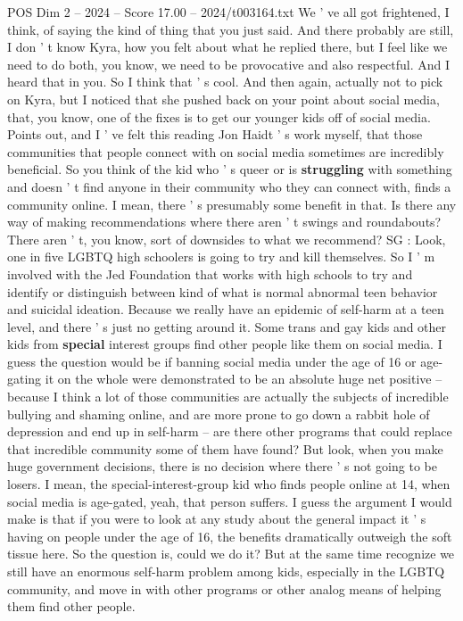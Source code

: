 \begin{textsample}{POS Dim 2 – 2024 – Score 17.00 – 2024/t003164.txt}
We ' ve all got frightened, I think, of saying the kind of thing that you just said.
And there probably are still, I don ' t know Kyra, how you felt about what he replied there, but I feel like we need to do both, you know, we need to be provocative and also respectful.
And I heard that in you.
So I think that ' s cool.
And then again, actually not to pick on Kyra, but I noticed that she pushed back on your point about social media, that, you know, one of the fixes is to get our younger kids off of social media.
Points out, and I ' ve felt this reading Jon Haidt ' s work myself, that those communities that people connect with on social media sometimes are incredibly beneficial.
So you think of the kid who ' s queer or is \textbf{struggling} with something and doesn ' t find anyone in their community who they can connect with, finds a community online.
I mean, there ' s presumably some benefit in that.
Is there any way of making recommendations where there aren ' t swings and roundabouts?
There aren ' t, you know, sort of downsides to what we recommend?
SG : Look, one in five LGBTQ high schoolers is going to try and kill themselves.
So I ' m involved with the Jed Foundation that works with high schools to try and identify or distinguish between kind of what is normal abnormal teen behavior and suicidal ideation.
Because we really have an epidemic of self-harm at a teen level, and there ' s just no getting around it.
Some trans and gay kids and other kids from \textbf{special} interest groups find other people like them on social media.
I guess the question would be if banning social media under the age of 16 or age-gating it on the whole were demonstrated to be an absolute huge net positive -- because I think a lot of those communities are actually the subjects of incredible bullying and shaming online, and are more prone to go down a rabbit hole of depression and end up in self-harm -- are there other programs that could replace that incredible community some of them have found?
But look, when you make huge government decisions, there is no decision where there ' s not going to be losers.
I mean, the special-interest-group kid who finds people online at 14, when social media is age-gated, yeah, that person suffers.
I guess the argument I would make is that if you were to look at any study about the general impact it ' s having on people under the age of 16, the benefits dramatically outweigh the soft tissue here.
So the question is, could we do it?
But at the same time recognize we still have an enormous self-harm problem among kids, especially in the LGBTQ community, and move in with other programs or other analog means of helping them find other people.

\end{textsample}
